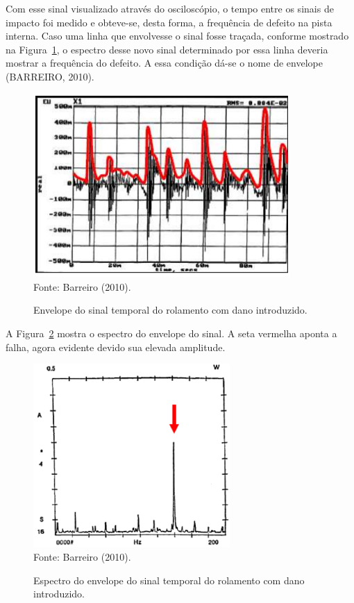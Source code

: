 \documentclass[
	12pt,				
	oneside,			
	a4paper,			
	english,			
	brazil,			
	]{abntex2ppgsi}
\begin{document}
Com esse sinal visualizado através do osciloscópio, o tempo entre os sinais de impacto foi medido e obteve-se, desta forma, a frequência de defeito na pista interna. Caso uma linha que envolvesse o sinal fosse traçada, conforme mostrado na Figura~\ref{sinal_envelope_rolamento_barreiro}, o espectro desse novo sinal determinado por essa linha deveria mostrar a frequência do defeito. A essa condição dá-se o nome de envelope (BARREIRO, 2010). 

\begin{figure}[H]
\centering
\caption {Envelope do sinal temporal do rolamento com dano introduzido.}
\includegraphics[width=\textwidth,height=70mm,keepaspectratio]{sinal_envelope_rolamento_barreiro} \\
Fonte: Barreiro (2010).
\label{sinal_envelope_rolamento_barreiro}
\end{figure}

A Figura~\ref{espectro_do_envelope_barreiro} mostra o espectro do envelope do sinal. A seta vermelha aponta a falha, agora evidente devido sua elevada amplitude.

\begin{figure}[H]
\centering
\caption {Espectro do envelope do sinal temporal do rolamento com dano introduzido.}
\includegraphics[width=\textwidth,height=70mm,keepaspectratio]{espectro_do_envelope_barreiro} \\
Fonte: Barreiro (2010).
\label{espectro_do_envelope_barreiro}
\end{figure}
\end{document}
